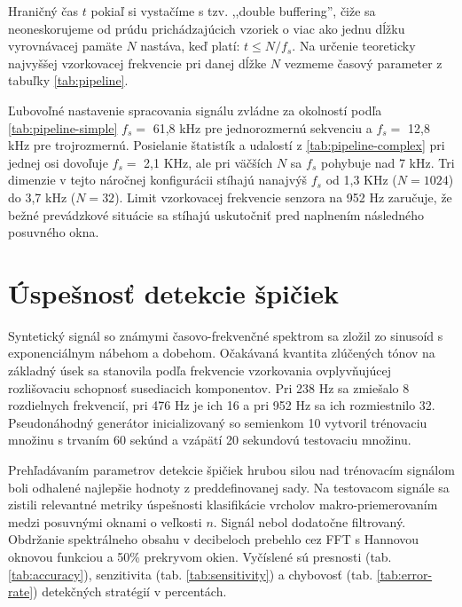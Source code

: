 Hraničný čas $t$ pokiaľ si vystačíme s tzv. ,,double buffering'', čiže sa neoneskorujeme od prúdu prichádzajúcich vzoriek o viac ako jednu
dĺžku vyrovnávacej pamäte $N$ nastáva, keď platí: $t \leq N / f_s$. Na určenie teoreticky najvyššej vzorkovacej frekvencie
pri danej dĺžke $N$ vezmeme časový parameter z tabuľky \ref{tab:pipeline}.

Ľubovoľné nastavenie spracovania signálu zvládne za okolností podľa \ref{tab:pipeline-simple} $f_s =$ 61,8 kHz pre jednorozmernú
sekvenciu a $f_s =$ 12,8 kHz pre trojrozmernú. Posielanie štatistík a udalostí z \ref{tab:pipeline-complex} pri jednej osi
dovoľuje $f_s =$ 2,1 KHz, ale pri väčších $N$ sa $f_s$ pohybuje nad 7 kHz. Tri dimenzie v tejto náročnej konfigurácii stíhajú nanajvýš $f_s$
od 1,3 KHz ($N = 1024$) do 3,7 kHz ($N = 32$). Limit vzorkovacej frekvencie senzora na 952 Hz zaručuje, že bežné prevádzkové
situácie sa stíhajú uskutočniť pred naplnením následného posuvného okna.

\section{Úspešnosť detekcie špičiek}
Syntetický signál so známymi časovo-frekvenčné spektrom sa zložil zo sinusoíd s exponenciálnym nábehom a dobehom.
Očakávaná kvantita zlúčených tónov na základný úsek sa stanovila podľa frekvencie vzorkovania ovplyvňujúcej rozlišovaciu
schopnosť susediacich komponentov. Pri 238 Hz sa zmiešalo 8 rozdielnych frekvencií, pri 476 Hz je ich 16 a pri 952 Hz sa
ich rozmiestnilo 32. Pseudonáhodný generátor inicializovaný so semienkom 10 vytvoril trénovaciu množinu s trvaním 60 sekúnd
a vzápätí 20 sekundovú testovaciu množinu.

Prehľadávaním parametrov detekcie špičiek hrubou silou nad trénovacím signálom boli odhalené najlepšie hodnoty z preddefinovanej sady.
Na testovacom signále sa zistili relevantné metriky úspešnosti klasifikácie vrcholov makro-priemerovaním medzi posuvnými oknami
o veľkosti $n$. Signál nebol dodatočne filtrovaný. Obdržanie spektrálneho obsahu v decibeloch prebehlo cez FFT s Hannovou
oknovou funkciou a 50\%  prekryvom okien. Vyčíslené sú presnosti (tab. \ref{tab:accuracy}), senzitivita (tab. \ref{tab:sensitivity}) a chybovosť (tab. \ref{tab:error-rate}) detekčných stratégií v percentách.

